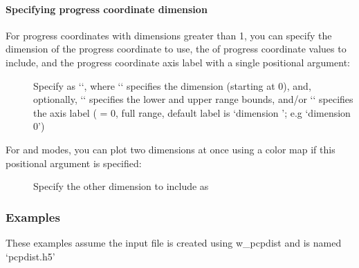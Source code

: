\documentclass[letterpaper,10pt,english]{sphinxmanual}
\begin{document}
\paragraph{Specifying progress coordinate dimension}
\label{\detokenize{users_guide/command_line_tools/plothist:specifying-progress-coordinate-dimension}}
For progress coordinates with dimensions greater than 1, you can specify
the dimension of the progress coordinate to use, the of progress
coordinate values to include, and the progress coordinate axis label
with a single positional argument:
\begin{description}
\item[{}] \leavevmode
Specify  as ‘‘, where
‘‘ specifies the dimension (starting at 0), and,
optionally, ‘‘ specifies the lower and upper range
bounds, and/or ‘‘ specifies the axis label (
 = 0, full range, default label is ‘dimension ’; e.g
‘dimension 0’)

\end{description}

For  and  modes, you can plot two dimensions
at once using a color map if this positional argument is specified:
\begin{description}
\item[{}] \leavevmode
Specify the other dimension to include as 

\end{description}


\subsubsection{Examples}
\label{\detokenize{users_guide/command_line_tools/plothist:examples}}
These examples assume the input file is created using w\_pcpdist and is
named ‘pcpdist.h5’
\end{document}
